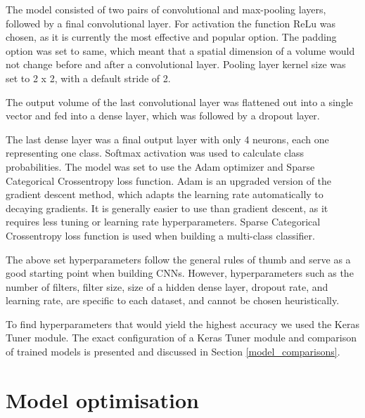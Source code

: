 The model consisted of two pairs of convolutional and max-pooling layers, followed by a final convolutional layer.
For activation the function ReLu was chosen, as it is currently the most effective and popular option\cite{cs231n}\cite{geron}.
The padding option was set to same, which meant that a spatial dimension of a volume would not change before and after a convolutional layer.
Pooling layer kernel size was set to 2 x 2, with a default stride of 2.

The output volume of the last convolutional layer was flattened out into a single vector and fed into a dense layer, which was followed by a dropout layer\footnotemark.

The last dense layer was a final output layer with only 4 neurons, each one representing one class.
Softmax activation was used to calculate class probabilities.
The model was set to use the Adam optimizer and Sparse Categorical Crossentropy loss function.
Adam is an upgraded version of the gradient descent method, which adapts the learning rate automatically to decaying gradients\cite{geron}.
It is generally easier to use than gradient descent, as it requires less tuning or learning rate hyperparameters.
Sparse Categorical Crossentropy loss function is used when building a multi-class classifier.

The above set hyperparameters follow the general rules of thumb and serve as a good starting point when building CNNs\cite{cs231n}.
However, hyperparameters such as the number of filters, filter size, size of a hidden dense layer, dropout rate, and learning rate, are specific to each dataset, and cannot be chosen heuristically.

To find hyperparameters that would yield the highest accuracy we used the Keras Tuner module.
The exact configuration of a Keras Tuner module and comparison of trained models is presented and discussed in Section \ref{model_comparisons}.

\section{ Model optimisation}

